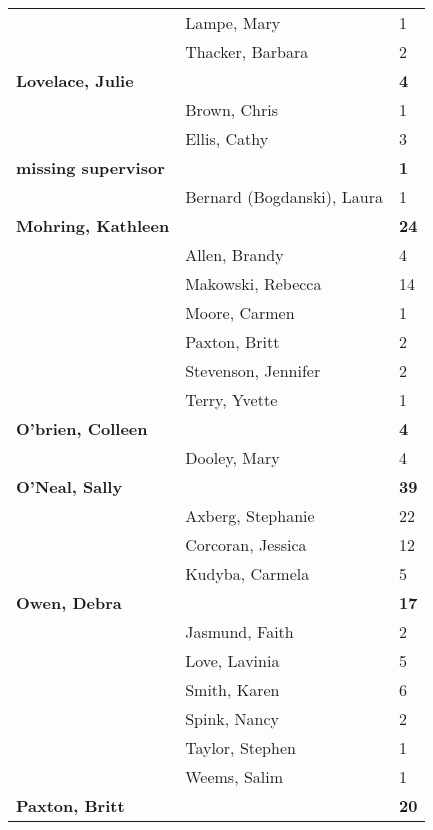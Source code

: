\documentclass{article}\usepackage[]{graphicx}\usepackage[]{color}
\begin{document}
{\begin{longtable} { >{\raggedright}p{}|p{}p{}}
   & Lampe, Mary & 1 \\ 
   & Thacker, Barbara & 2 \\ 
  \textbf{Lovelace, Julie} &  & \hspace{2cm}\textbf{4} \\ 
   \rowcolor[gray]{0.90} & Brown, Chris & 1 \\ 
   \rowcolor[gray]{0.90} & Ellis, Cathy & 3 \\ 
   \rowcolor[gray]{0.90}\textbf{missing supervisor} &  & \hspace{2cm}\textbf{1} \\ 
   & Bernard (Bogdanski), Laura & 1 \\ 
  \textbf{Mohring, Kathleen} &  & \hspace{2cm}\textbf{24} \\ 
   & Allen, Brandy & 4 \\ 
   \rowcolor[gray]{0.90} & Makowski, Rebecca & 14 \\ 
   \rowcolor[gray]{0.90} & Moore, Carmen & 1 \\ 
   \rowcolor[gray]{0.90} & Paxton, Britt & 2 \\ 
   & Stevenson, Jennifer & 2 \\ 
   & Terry, Yvette & 1 \\ 
  \textbf{O'brien, Colleen} &  & \hspace{2cm}\textbf{4} \\ 
   \rowcolor[gray]{0.90} & Dooley, Mary & 4 \\ 
   \rowcolor[gray]{0.90}\textbf{O'Neal, Sally} &  & \hspace{2cm}\textbf{39} \\ 
   \rowcolor[gray]{0.90} & Axberg, Stephanie & 22 \\ 
   & Corcoran, Jessica & 12 \\ 
   & Kudyba, Carmela & 5 \\ 
  \textbf{Owen, Debra} &  & \hspace{2cm}\textbf{17} \\ 
   \rowcolor[gray]{0.90} & Jasmund, Faith & 2 \\ 
   \rowcolor[gray]{0.90} & Love, Lavinia & 5 \\ 
   \rowcolor[gray]{0.90} & Smith, Karen & 6 \\ 
   & Spink, Nancy & 2 \\ 
   & Taylor, Stephen & 1 \\ 
   & Weems, Salim & 1 \\ 
   \rowcolor[gray]{0.90}\textbf{Paxton, Britt} &  & \hspace{2cm}\textbf{20} \\ 

\end{longtable}}
\end{document}
